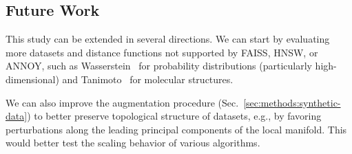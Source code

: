 

\subsection{Future Work}

This study can be extended in several directions.
We can start by evaluating more datasets and distance functions not supported by FAISS, HNSW, or ANNOY, such as Wasserstein~\cite{vallender1974calculation} for probability distributions (particularly high-dimensional) and Tanimoto~\cite{bajusz2015tanimoto} for molecular structures.

We can also improve the augmentation procedure (Sec.~\ref{sec:methods:synthetic-data}) to better preserve topological structure of datasets, e.g., by favoring perturbations along the leading principal components of the local manifold.
This would better test the scaling behavior of various algorithms.

